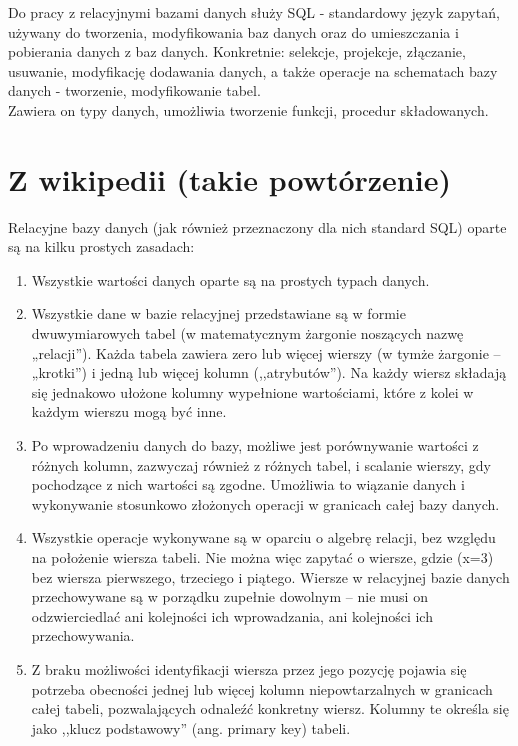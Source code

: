 \documentclass[a4paper,twoside]{report}
\begin{document}
Do pracy z relacyjnymi bazami danych służy SQL - standardowy język zapytań, używany do tworzenia, modyfikowania baz danych oraz do umieszczania i pobierania danych z baz danych.
Konkretnie: selekcje, projekcje, złączanie, usuwanie, modyfikację dodawania danych, a także operacje na schematach bazy danych - tworzenie, modyfikowanie tabel. \\
Zawiera on typy danych, umożliwia tworzenie funkcji, procedur składowanych.


\section{Z wikipedii (takie powtórzenie)}
Relacyjne bazy danych (jak również przeznaczony dla nich standard SQL) oparte są na kilku prostych zasadach:

\begin{enumerate}
\item Wszystkie wartości danych oparte są na prostych typach danych.
\item Wszystkie dane w bazie relacyjnej przedstawiane są w formie dwuwymiarowych tabel (w matematycznym żargonie noszących nazwę „relacji”). Każda tabela zawiera zero lub więcej wierszy (w tymże żargonie – „krotki”) i jedną lub więcej kolumn (,,atrybutów''). Na każdy wiersz składają się jednakowo ułożone kolumny wypełnione wartościami, które z kolei w każdym wierszu mogą być inne.
\item Po wprowadzeniu danych do bazy, możliwe jest porównywanie wartości z różnych kolumn, zazwyczaj również z różnych tabel, i scalanie wierszy, gdy pochodzące z nich wartości są zgodne. Umożliwia to wiązanie danych i wykonywanie stosunkowo złożonych operacji w granicach całej bazy danych.
\item Wszystkie operacje wykonywane są w oparciu o algebrę relacji, bez względu na położenie wiersza tabeli. Nie można więc zapytać o wiersze, gdzie (x=3) bez wiersza pierwszego, trzeciego i piątego. Wiersze w relacyjnej bazie danych przechowywane są w porządku zupełnie dowolnym – nie musi on odzwierciedlać ani kolejności ich wprowadzania, ani kolejności ich przechowywania.
\item Z braku możliwości identyfikacji wiersza przez jego pozycję pojawia się potrzeba obecności jednej lub więcej kolumn niepowtarzalnych w granicach całej tabeli, pozwalających odnaleźć konkretny wiersz. Kolumny te określa się jako ,,klucz podstawowy'' (ang. primary key) tabeli.
\end{enumerate}
\end{document}
